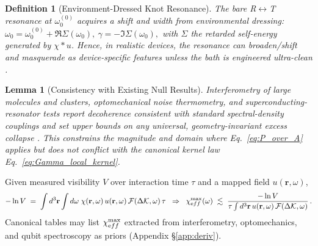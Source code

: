 \documentclass[11pt]{article}
\newtheorem{lemma}[theorem]{Lemma}
\newtheorem{definition}{Definition}[section]
\begin{document}
	\begin{definition}[Environment-Dressed Knot Resonance]
		\label{def:dressed_resonance}
		The bare R$\leftrightarrow$T resonance at \(\omega_0^{(0)}\) acquires a shift and width from environmental dressing:
		\(
		\omega_0=\omega_0^{(0)}+\Re\Sigma(\omega_0),\
		\gamma=-\Im\Sigma(\omega_0),
		\)
		with $\Sigma$ the retarded self-energy generated by \(\chi\!\ast u\). Hence, in realistic devices, the resonance can broaden/shift and masquerade as device-specific features unless the bath is engineered ultra-clean \cite{Zurek2003,Krantz2019APR}.
	\end{definition}

	\begin{lemma}[Consistency with Existing Null Results]
		\label{lem:null_results}
		Interferometry of large molecules and clusters, optomechanical noise thermometry, and superconducting-resonator tests report decoherence consistent with standard spectral-density couplings and set upper bounds on any \emph{universal}, geometry-invariant excess collapse \cite{Hornberger2012RMP,Nimmrichter2014PRL,Schrinski2023PRL}. This constrains the \emph{magnitude and domain} where Eq.~\eqref{eq:P_over_A} applies but does not conflict with the canonical kernel law Eq.~\eqref{eq:Gamma_local_kernel}.
	\end{lemma}

	\begin{calibration}
		\label{cal:chi_bounds}
		Given measured visibility \(V\) over interaction time \(\tau\) and a mapped field \(u(\mathbf r,\omega)\),
		\begin{equation}
			-\ln V \;=\; \int d^3\mathbf r \int d\omega\;\chi(\mathbf r,\omega)\,u(\mathbf r,\omega)\,\mathcal F(\Delta\mathcal K,\omega)\,\tau
			\;\;\Rightarrow\;\;
			\chi_{\textrm eff}^{\max}(\omega)\;\lesssim\;
			\frac{-\ln V}{\tau \int d^3\mathbf r\, u(\mathbf r,\omega)\,\mathcal F(\Delta\mathcal K,\omega)}\,.
			\label{eq:chi_bound}
		\end{equation}
		Canonical tables may list \(\chi_{\textrm eff}^{\max}\) extracted from interferometry, optomechanics, and qubit spectroscopy as priors (Appendix \S\ref{app:deriv}).
	\end{calibration}
\end{document}
